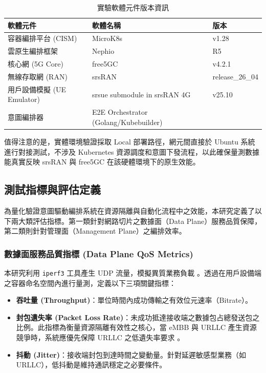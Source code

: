 \begin{table}[htbp]
    \centering
    \caption{實驗軟體元件版本資訊}
    \label{tab:software_versions}
    \begin{tabular}{|l|l|l|}
    \hline
    \textbf{軟體元件} & \textbf{軟體名稱} & \textbf{版本}\\ \hline
    容器編排平台 (CISM) & MicroK8s & v1.28\\ \hline
    雲原生編排框架 & Nephio & R5 \\ \hline
    核心網 (5G Core) & free5GC & v4.2.1 \\ \hline
    無線存取網 (RAN) & srsRAN & release\_26\_04 \\ \hline
    用戶設備模擬 (UE Emulator) & srsue submodule in srsRAN 4G & v25.10 \\ \hline
    意圖編排器 & E2E Orchestrator (Golang/Kubebuilder) & \\ \hline
    \end{tabular}
\end{table}

值得注意的是，實體環境驗證採取 Local 部署路徑，網元間直接於 Ubuntu 系統進行對接測試，不涉及 Kubernetes 資源調度和意圖下發流程，以此確保量測數據能真實反映 srsRAN 與 free5GC 在該硬體環境下的原生效能。

\subsection{測試指標與評估定義}
\label{subsec:metrics_definition}

為量化驗證意圖驅動編排系統在資源隔離與自動化流程中之效能，本研究定義了以下兩大類評估指標。第一類針對網路切片之數據面（Data Plane）服務品質保障，第二類則針對管理面（Management Plane）之編排效率。

\subsubsection{數據面服務品質指標 (Data Plane QoS Metrics)}
本研究利用 \texttt{iperf3} 工具產生 UDP 流量，模擬異質業務負載 。透過在用戶設備端之容器命名空間內進行量測，定義以下三項關鍵指標：
\begin{itemize}
    \item \textbf{吞吐量 (Throughput)}：單位時間內成功傳輸之有效位元速率（Bitrate）。
    \item \textbf{封包遺失率 (Packet Loss Rate)}：未成功抵達接收端之數據包占總發送包之比例。此指標為衡量資源隔離有效性之核心，當 eMBB 與 URLLC 產生資源競爭時，系統應優先保障 URLLC 之低遺失率要求 。
    \item \textbf{抖動 (Jitter)}：接收端封包到達時間之變動量。針對延遲敏感型業務（如 URLLC），低抖動是維持通訊穩定之必要條件。
\end{itemize}

